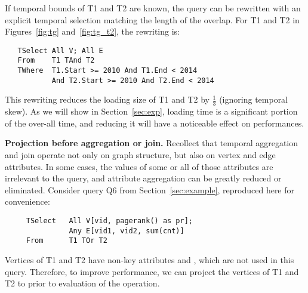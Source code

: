 If temporal bounds of T1 and T2 are known, the query can be rewritten
with an explicit temporal selection matching the length of the
overlap.  For T1 and T2 in Figures~\ref{fig:tg} and~\ref{fig:tg_t2},
the rewriting is:

\begin{small}
\begin{verbatim}
   TSelect All V; All E
   From    T1 TAnd T2
   TWhere  T1.Start >= 2010 And T1.End < 2014 
           And T2.Start >= 2010 And T2.End < 2014
\end{verbatim}
\end{small}

This rewriting reduces the loading size of T1 and T2 by $\frac{1}{3}$
(ignoring temporal skew).  As we will show in Section~\ref{sec:exp},
loading time is a significant portion of the over-all time, and
reducing it will have a noticeable effect on performances.

{\bf Projection before aggregation or join.}  Recollect that temporal
aggregation and join operate not only on graph structure, but also on
vertex and edge attributes.  In some cases, the values of some or all
of those attributes are irrelevant to the query, and attribute
aggregation can be greatly reduced or eliminated.  Consider query Q6
from Section~\ref{sec:example}, reproduced here for convenience:

\begin{small}
\begin{verbatim}
     TSelect   All V[vid, pagerank() as pr]; 
               Any E[vid1, vid2, sum(cnt)]
     From      T1 TOr T2
\end{verbatim}
\end{small}

Vertices of T1 and T2 have non-key attributes  and
, which are not used in this query. Therefore, to
improve performance, we can project the vertices of T1 and T2 to
 prior to evaluation of the  operation.

